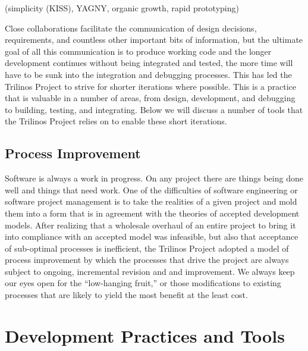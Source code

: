 \documentclass[12pt,relax]{article}
\begin{document}
(simplicity (KISS), YAGNY, organic growth, rapid prototyping)

Close collaborations facilitate the communication of design decisions, 
requirements, and countless other important bits of information, but the
ultimate goal of all this communication is to produce working code and the
longer development continues without being integrated and tested, the more
time will have to be sunk into the integration and debugging processes.  This
has led the Trilinos Project to strive for shorter iterations where possible.
This is a practice that is valuable in a number of areas, from design,
development, and debugging to building, testing, and integrating.  Below we
will discuss a number of tools that the Trilinos Project relies on to enable
these short iterations.

\subsection{Process Improvement}

Software is always a work in progress.  On any project there are things
being done well and things that need work.  One of the difficulties of 
software engineering or software project management is to take the realities
of a given project and mold them into a form that is in agreement with the
theories of accepted development models.  After realizing that a wholesale 
overhaul of an entire project to bring it into compliance with an accepted
model was infeasible, but also that acceptance of sub-optimal processes is
inefficient, the Trilinos Project adopted a model of process improvement by
which the processes that drive the project are always subject to ongoing,
incremental revision and and improvement.  We always keep our eyes open for the 
``low-hanging fruit,'' or those modifications to existing processes that are
likely to yield the most benefit at the least cost.

\clearpage


\section{Development Practices and Tools}
\label{Section:Tools}
\end{document}
